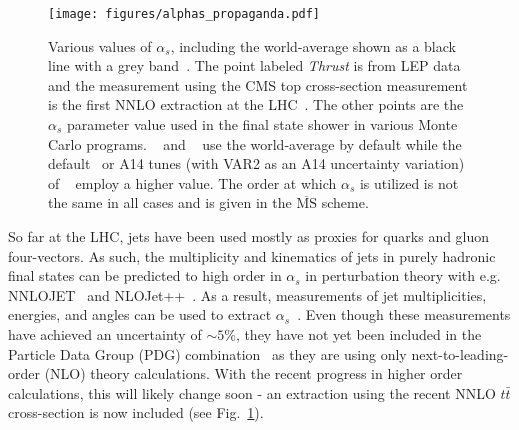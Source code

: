 \begin{figure}
\begin{center}
\texttt{[image: figures/alphas\_propaganda.pdf]}
\end{center}
\caption{Various values of $\alpha_s$, including the world-average
  shown as a black line with a grey band~\cite{Olive:2016xmw}.  The
  point labeled \textit{Thrust} is from LEP data~\cite{Abbate:2010xh,Hoang:2015hka,Heister:2003aj,Abdallah:2004xe,Abreu:1996mk,Abreu:1999rc,Biebel:1999zt,Adeva:1992gv,Abbiendi:2004qz,Abe:1994mf} and the measurement
  using the CMS top cross-section measurement is the first NNLO
  extraction at the LHC~\cite{Chatrchyan:2013haa}.  The other points are the $\alpha_s$
  parameter value used in the final state shower in various Monte
  Carlo programs.  \herwig~\cite{Bellm:2015jjp} and \sherpa~\cite{Gleisberg:2008ta} use the world-average by
  default while the default~\cite{Skands:2014pea} or A14 tunes (with VAR2 as an A14 uncertainty variation)~\cite{ATL-PHYS-PUB-2014-021} of \pythia~\cite{Sjostrand:2006za,Sjostrand:2014zea} employ a higher
  value.  The order at which $\alpha_s$ is utilized is not the same in
  all cases and is given in the $\overline{\text{MS}}$
  scheme.}
\label{fig:propaganda}
\end{figure}

So far at the LHC, jets have been used mostly as proxies for quarks and gluon four-vectors.  As such, the multiplicity and kinematics of jets in purely hadronic final states can be predicted to high order in $\alpha_s$ in perturbation theory with e.g. NNLOJET~\cite{Currie:2016bfm,Currie:2017ctp} and NLOJet++~\cite{Nagy:2001fj,Nagy:2003tz}.  As a result, measurements of jet multiplicities, energies, and angles can be used to extract $\alpha_s$~\cite{ATLAS:2015yaa,Aaboud:2017fml,Khachatryan:2014waa,CMS:2014mna,Chatrchyan:2013txa}.   Even though these measurements have achieved an uncertainty of $\sim 5\%$, they have not yet been included in the Particle Data Group (PDG) combination~\cite{Olive:2016xmw} as they are using only next-to-leading-order (NLO) theory calculations.  With the recent progress in higher order calculations, this will likely change soon - an extraction using the recent NNLO $t\bar{t}$ cross-section is now included (see Fig.~\ref{fig:propaganda}).

